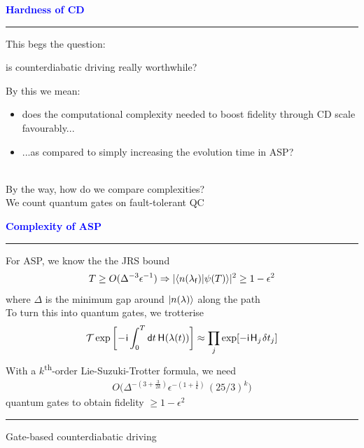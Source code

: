 \documentclass{beamer}
\def\gemph#1{{\color{mygreen}#1}}
\def\lbt{} %
\def\mt#1{\kern0.025em\mathsf{#1}\kern0.025em}
\def\d{\mathsf d}
\def\i{\mathsf i}
\def\lambdai{{\lambda_{\sf i}}}
\def\lambdaf{{\lambda_{\sf f}}}
\def\>{\kern0.08em}
\newenvironment{dia}[2]
{
	\begin{frame}
	\vspace{1mm}
	{\small #1}
	\hfill
    {\small\bf\textcolor{blue}{#2}}
	\vspace{3mm}
	\hrule
	\bigskip
}
{
	\vfill
	\end{frame}
}
\begin{document}
\begin{dia}{\lbt}{Hardness of CD}
This begs the question: \pause
\begin{center}
    \gemph{is counterdiabatic driving really worthwhile?} \pause
\end{center}
By this we mean:
\begin{itemize}
    \item does the computational complexity needed to boost fidelity through CD scale favourably... \pause
    \item ...as compared to simply increasing the evolution time in ASP?
\end{itemize}
$ $\\ \pause
By the way, how do we compare complexities? \\[4mm] \pause
We count \gemph{quantum gates} on fault-tolerant QC
\vspace{-1cm}
\end{dia}

\begin{dia}{\lbt}{Complexity of ASP}
For ASP, we know the the JRS bound
\begin{align*}
    T \geq O(\Delta^{-3} \epsilon^{-1} 
    ) \Rightarrow |\braket{n(\lambdaf)}{\psi(T)}|^2 \geq 1 - \epsilon^2
\end{align*}
where $\Delta$ is the \gemph{minimum gap} around ${|n(\lambda)\rangle}$ along the path \\[2mm] \pause
To turn this into quantum gates, we trotterise
\begin{align*}
    \mathcal T\exp \bigg[ \!-\!\i \int_0^T \d t \, \mt H(\lambda(t)) \bigg] \approx \prod_j \exp[-\i \> \mt H_j \> \delta t_j]
\end{align*} \pause
With a $k$\textsuperscript{th}-order \gemph{Lie-Suzuki-Trotter formula}\pause, we need
\begin{align*}
    O\Big( \Delta^{-(3 + \frac3{2k})} \epsilon^{-(1 + \frac1k)} \, (25/3)^k \Big)
\end{align*}
quantum gates to obtain fidelity $\geq 1 - \epsilon^2$
\vspace{-1cm}
\end{dia}

\begin{dia}{\lbt}{}
\vspace{2.5cm}
\begin{center}
\begin{LARGE}
\textcolor{mygreen}{Gate-based counterdiabatic driving}
\end{LARGE}
\end{center}
\vspace*{1.5cm}
\end{dia}
\end{document}
